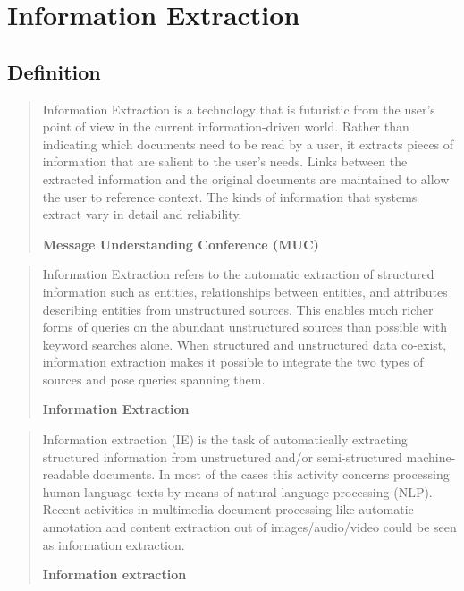 \section{Information Extraction}
\label{sec:information-extraction}


\subsection{Definition}

\begin{quote}
Information Extraction is a technology that is futuristic from the user's point of view in the current information-driven world. Rather than indicating which documents need to be read by a user, it extracts pieces of information that are salient to the user's needs. Links between the extracted information and the original documents are maintained to allow the user to reference context. The kinds of information that systems extract vary in detail and reliability.

\hfill \textbf{Message Understanding Conference (MUC)}

\hfill \citeauthor{Chinchor:2001} \cite{Chinchor:2001}
\end{quote}

\begin{quote}
Information Extraction refers to the automatic extraction of structured information such as entities, relationships between entities, and attributes describing entities from unstructured sources. This enables much richer forms of queries on the abundant unstructured sources than possible with keyword searches alone. When structured and unstructured data co-exist, information extraction makes it possible to integrate the two types of sources and pose queries spanning them.

\hfill \textbf{Information Extraction}

\hfill \citeauthor{Sarawagi:2008} \cite{Sarawagi:2008}
\end{quote}

\begin{quote}
Information extraction (IE) is the task of automatically extracting structured information from unstructured and/or semi-structured machine-readable documents. In most of the cases this activity concerns processing human language texts by means of natural language processing (NLP). Recent activities in multimedia document processing like automatic annotation and content extraction out of images/audio/video could be seen as information extraction.

\hfill \textbf{Information extraction}

\hfill \citeauthor{Wikipedia:IE:2012} \cite{Wikipedia:IE:2012}
\end{quote}


